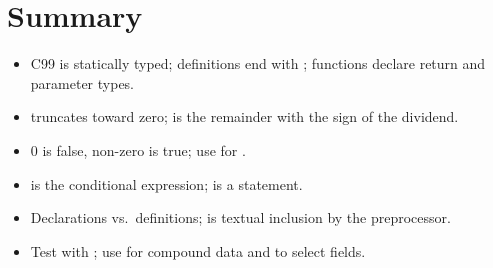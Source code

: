 \section{Summary}
\begin{itemize}
  \item C99 is statically typed; definitions end with \code{;}; functions declare return and
    parameter types.
  \item \code{/} truncates toward zero; \code{\%} is the remainder with the sign of the dividend.
  \item 0 is false, non-zero is true; use  for .
  \item {} is the conditional expression;  is a statement.
  \item Declarations vs.\ definitions;  is textual inclusion by the preprocessor.
  \item Test with ; use  for compound data and  to select fields.
\end{itemize}
